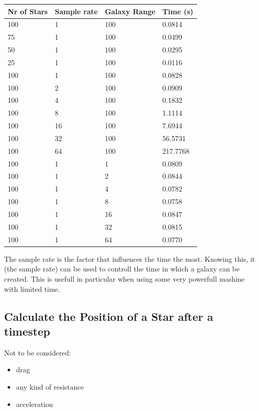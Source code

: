 \begin{tabular}{l | l | l | l}
  Nr of Stars & Sample rate & Galaxy Range & Time (s) \\\hline


  100         & 1           & 100          & 0.0814 \\
  75          & 1           & 100          & 0.0499 \\
  50          & 1           & 100          & 0.0295 \\
  25          & 1           & 100          & 0.0116 \\ \hline

  100         & 1           & 100          & 0.0828 \\
  100         & 2           & 100          & 0.0909 \\
  100         & 4           & 100          & 0.1832 \\
  100         & 8           & 100          & 1.1114 \\
  100         & 16          & 100          & 7.6944 \\
  100         & 32          & 100          & 56.5731 \\
  100         & 64          & 100          & 217.7768 \\ \hline

  100         & 1           & 1            & 0.0809 \\
  100         & 1           & 2            & 0.0844 \\
  100         & 1           & 4            & 0.0782 \\
  100         & 1           & 8            & 0.0758 \\
  100         & 1           & 16           & 0.0847 \\
  100         & 1           & 32           & 0.0815 \\
  100         & 1           & 64           & 0.0770 \\

\end{tabular}

The sample rate is the factor that influences the time the most. Knowing this,
it (the sample rate) can be used to controll the time in which a galaxy can
be created.
This is usefull in particular when using some very powerfull mashine with
limited time.

\subsection{Calculate the Position of a Star after a timestep}

Not to be considered:
\begin{itemize}
  \item drag
  \item any kind of resistance
  \item acceleration
\end{itemize}
